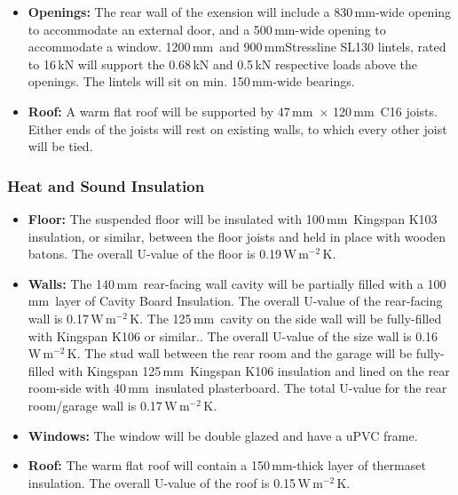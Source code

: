 \documentclass{extension}
\newcommand{\mm}{\,$\mathrm{mm}$}
\newcommand{\uunit}{\,$\mathrm{W\,m^{-2}\,K}$}
\begin{document}
\begin{itemize}
  \item {\bf Openings:} The rear wall of the exension will include a 830\mm -wide opening to accommodate an external door, and a 500\mm -wide opening to accommodate a window. 1200\mm\ and 900\mm Stressline SL130 lintels\cite{esteel}, rated to 16\,kN will support the 0.68\,kN and 0.5\,kN respective loads above the openings. The lintels will sit on min. 150\mm -wide bearings.
  \item {\bf Roof:} A warm flat roof will be supported by 47\mm\ $\times$ 120\mm\ C16 joists. Either ends of the joists will rest on existing walls, to which every other joist will be tied.
\end{itemize}

\subsubsection{Heat and Sound Insulation}
\begin{itemize}
  \item {\bf Floor:} The suspended floor will be insulated with 100\mm\ Kingspan K103 insulation, or similar, between the floor joists and held in place with wooden batons. The overall U-value of the floor is 0.19\uunit .
  \item {\bf Walls:} The 140\mm\ rear-facing wall cavity will be partially filled with a 100\mm\ layer of Cavity Board Insulation.\cite{uw1ins} The overall U-value of the rear-facing wall is 0.17\uunit . The 125\mm\ cavity on the side wall will be fully-filled with Kingspan K106 or similar.\cite{uw2ins}. The overall U-value of the size wall is 0.16\uunit. The stud wall between the rear room and the garage will be fully-filled with Kingspan 125\mm\ Kingspan K106\cite{uw2ins} insulation and lined on the rear room-side with 40\mm\ insulated plasterboard.\cite{uw3ins} The total U-value for the rear room/garage wall is 0.17\uunit .
  \item {\bf Windows:} The window will be double glazed and have a uPVC frame.
  \item {\bf Roof:} The warm flat roof will contain a 150\mm -thick layer of thermaset insulation.\cite{erins} The overall U-value of the roof is 0.15\uunit .
\end{itemize}
\end{document}
